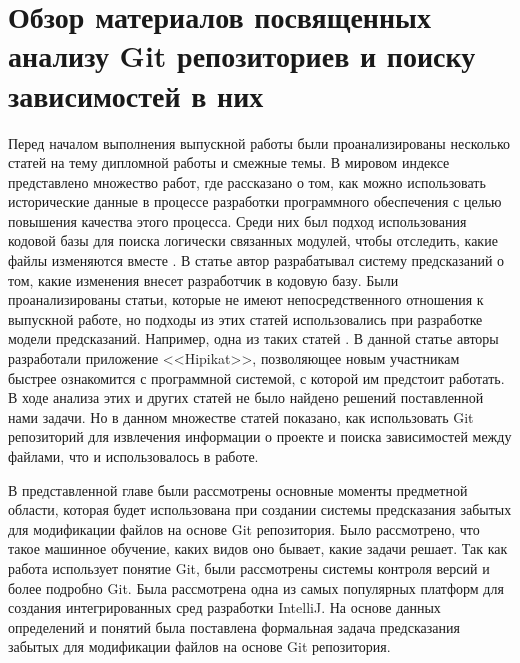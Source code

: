 \section{Обзор материалов посвященных анализу Git репозиториев и поиску зависимостей в них}
Перед началом выполнения выпускной работы были проанализированы несколько статей на тему дипломной работы и смежные темы. В мировом индексе представлено множество работ, где рассказано о том, как можно использовать исторические данные в процессе разработки программного обеспечения с целью повышения качества этого процесса. Среди них был подход использования кодовой базы для поиска логически связанных модулей, чтобы отследить, какие файлы изменяются вместе \cite{logical-modules}. В статье \cite{source-change} автор разрабатывал систему предсказаний о том, какие изменения внесет разработчик в кодовую базу. Были проанализированы статьи, которые не имеют непосредственного отношения к выпускной работе, но подходы из этих статей использовались при разработке модели предсказаний. Например, одна из таких статей \cite{project-memory}. В данной статье авторы разработали приложение <<Hipikat>>, позволяющее новым участникам быстрее ознакомится с программной системой, с которой им предстоит работать. В ходе анализа этих и других статей не было найдено решений поставленной нами задачи. Но в данном множестве статей показано, как использовать Git репозиторий для извлечения информации о проекте и поиска зависимостей между файлами, что и использовалось в работе.

\chapterconclusion
В представленной главе были рассмотрены основные моменты предметной области, которая будет использована при создании системы предсказания забытых для модификации файлов на основе Git репозитория. Было рассмотрено, что такое машинное обучение, каких видов оно бывает, какие задачи решает. Так как работа использует понятие Git, были рассмотрены системы контроля версий и более подробно Git. Была рассмотрена одна из самых популярных платформ для создания интегрированных сред разработки IntelliJ. На основе данных определений и понятий была поставлена формальная задача предсказания забытых для модификации файлов на основе Git репозитория.